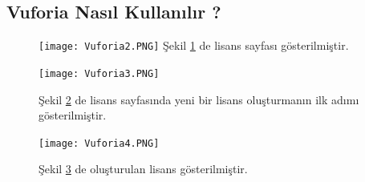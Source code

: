 \documentclass[12pt, a4paper]{article}
\begin{document}
	\subsection{Vuforia Nasıl Kullanılır ?}
	
	
	\newpage
	\begin{figure}[!ht]
		\caption{}
		\centering
		\texttt{[image: Vuforia2.PNG]}
		\label{gantt}
		Şekil \ref{gantt} de lisans sayfası gösterilmiştir\cite{Vuforia}.	
		
		
		
	\end{figure}
	
	\begin{figure}[!ht]
		\caption{}
		\centering
		\texttt{[image: Vuforia3.PNG]}
		
		\label{gantt1}
		Şekil \ref{gantt1} de lisans sayfasında yeni bir lisans oluşturmanın ilk adımı gösterilmiştir\cite{Vuforia}.	
		
		
	\end{figure}
	\newpage
	\begin{figure}[!ht]
		\caption{}
		\centering
		\texttt{[image: Vuforia4.PNG]}
		
		\label{gantt2}
		Şekil \ref{gantt2} de oluşturulan lisans gösterilmiştir\cite{Vuforia}.	
	\end{figure}
	
\end{document}
